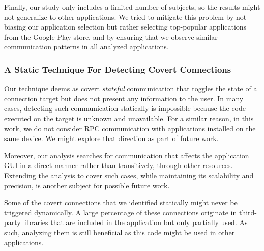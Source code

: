Finally, our study only includes a limited number of subjects, so the results might not generalize to other applications.
We tried to mitigate this problem by not biasing our application selection but rather selecting top-popular applications from the Google Play store, and by ensuring that we observe similar communication patterns in all analyzed applications.

\subsubsection{A Static Technique For Detecting Covert Connections}
Our technique deems 
%
as covert \emph{stateful} communication that toggles
the state of a connection target but does not present any information to the user. 
In many cases, detecting such
communication statically is impossible because the code executed on
the target is unknown and unavailable. 
For a similar reason, in this work, we do not consider RPC communication with applications
installed on the same device. We might explore that direction as part of future work. 

Moreover, our analysis searches for communication that affects the
application GUI in a direct manner rather than transitively, through other resources. 
Extending the analysis to cover such cases, while maintaining its scalability and precision, 
is another subject for possible future work.
 
Some of the covert connections that we identified statically might never be triggered dynamically. 
A large percentage of these connections originate in  
third-party libraries that are included in the application but only partially used. 
As such, analyzing them is still beneficial as this code might be used in other applications.

